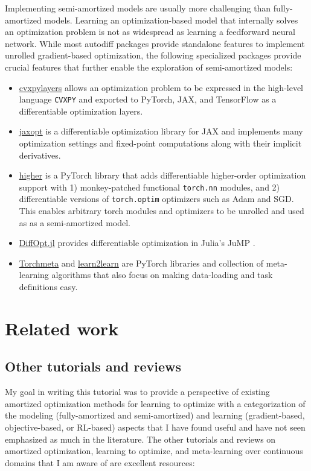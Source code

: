 \documentclass[twoside,11pt]{article}
\begin{document}
Implementing semi-amortized models are usually more challenging
than fully-amortized models. Learning an optimization-based
model that internally solves an optimization problem is
not as widespread as learning a feedforward neural network.
While most autodiff packages provide standalone features to implement
unrolled gradient-based optimization, the following specialized
packages provide crucial features that further enable the
exploration of semi-amortized models:
\begin{itemize}
\item \href{https://github.com/cvxgrp/cvxpylayers}{cvxpylayers}
  \citep{agrawal2019differentiable}
  allows an optimization problem to be expressed in the
  high-level language \verb!CVXPY! \citep{diamond2016cvxpy}
  and exported to PyTorch, JAX, and TensorFlow
  as a differentiable optimization layers.
\item \href{https://github.com/google/jaxopt}{jaxopt}
  \citep{blondel2021efficient}
  is a differentiable optimization library for JAX
  and implements many optimization settings and fixed-point
  computations along with their implicit derivatives.
\item \href{https://github.com/facebookresearch/higher}{higher}
  \citep{grefenstette2019generalized}
  is a PyTorch library that adds differentiable higher-order
  optimization support with
  1) monkey-patched functional \verb!torch.nn! modules,
  and 2) differentiable versions of \verb!torch.optim!
  optimizers such as Adam and SGD.
  This enables arbitrary torch modules and optimizers
  to be unrolled and used as as a semi-amortized model.
\item \href{https://github.com/jump-dev/DiffOpt.jl}{DiffOpt.jl}
  provides differentiable optimization in Julia's JuMP
  \citep{DunningHuchetteLubin2017}.
\item \href{https://github.com/tristandeleu/pytorch-meta}{Torchmeta}
  \citep{deleu2019torchmeta}
  and
  \href{http://learn2learn.net}{learn2learn}
  \citep{arnold2020learn2learn}
  are PyTorch libraries and collection of meta-learning
  algorithms that also focus on making data-loading
  and task definitions easy.
\end{itemize}

\section{Related work}
\subsection{Other tutorials and reviews}
My goal in writing this tutorial was to provide a perspective
of existing amortized optimization methods for learning
to optimize with a categorization of the
modeling (fully-amortized and semi-amortized)
and learning (gradient-based, objective-based, or RL-based)
aspects that I have found useful and have not seen
emphasized as much in the literature.
The other tutorials and reviews on
amortized optimization, learning to optimize, and
meta-learning over continuous domains
that I am aware of are excellent resources:
\end{document}
